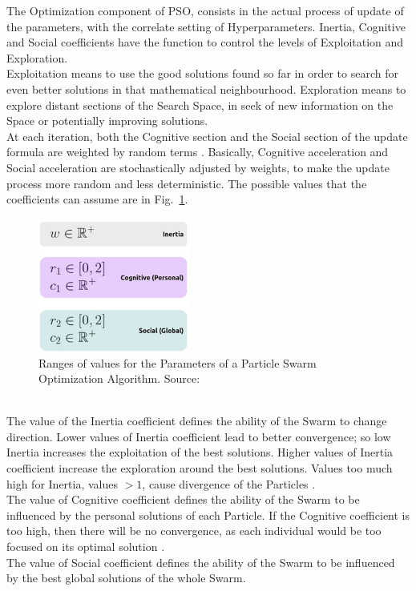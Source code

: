 The Optimization component of PSO, consists in the actual process of update of the parameters, with the correlate setting of Hyperparameters.
Inertia, Cognitive and Social coefficients have the function to control the levels of Exploitation and Exploration.
\\[0.3cm]Exploitation means to use the good solutions found so far in order to search for even better solutions in that mathematical neighbourhood. Exploration means to explore distant sections of the Search Space, in seek of new information on the Space or potentially improving solutions.
% 
\\[0.3cm]At each iteration, both the Cognitive section and the Social section of the update formula are weighted by random terms \cite{Tesi-3.2} \cite{Tesi-3.5}.
Basically, Cognitive acceleration and Social acceleration are stochastically adjusted by weights, to make the update process more random and less deterministic. The possible values that the coefficients can assume are in Fig.~\ref{fig:figure-3.1.3}.
\begin{figure}[t]
	\centering
	\includegraphics[width=5cm]{figures/figure-3.1.3.png}
	\caption[Values Ranges for PSO Parameters]{Ranges of values for the Parameters of a Particle Swarm Optimization Algorithm. Source:~\cite{Tesi-3.2}}
	\label{fig:figure-3.1.3}
\end{figure}
% 
\\[0.3cm]The value of the Inertia coefficient defines the ability of the Swarm to change direction.
Lower values of Inertia coefficient lead to better convergence; so low Inertia increases the exploitation of the best solutions.
Higher values of Inertia coefficient increase the exploration around the best solutions.
Values too much high for Inertia, values $>1$, cause divergence of the Particles \cite{Tesi-3.2}.
% 
\\[0.3cm]The value of Cognitive coefficient defines the ability of the Swarm to be influenced by the personal solutions of each Particle.
If the Cognitive coefficient is too high, then there will be no convergence, as each individual would be too focused on its optimal solution \cite{Tesi-3.2}.
% 
\\[0.3cm]The value of Social coefficient defines the ability of the Swarm to be influenced by the best global solutions of the whole Swarm.

